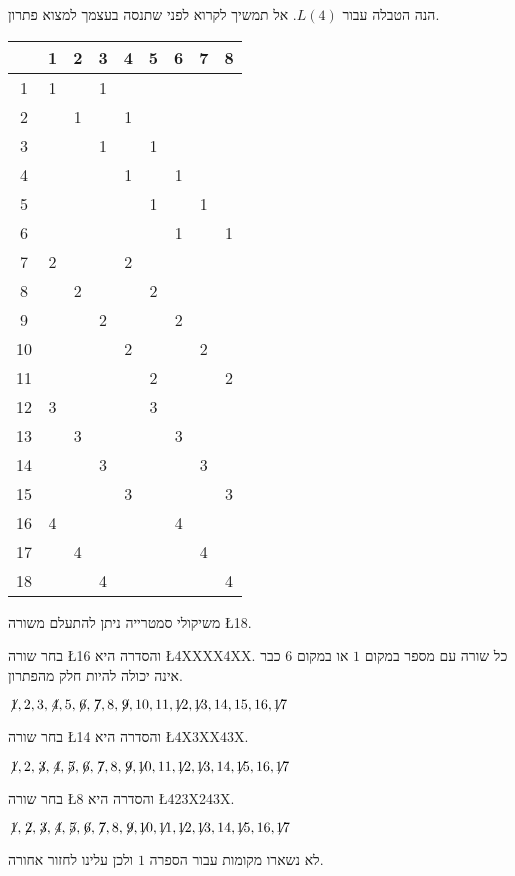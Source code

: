 הנה הטבלה עבור
$L(4)$.
אל תמשיך לקרוא לפני שתנסה בעצמך למצוא פתרון.
\begin{center}
\addtolength{\tabcolsep}{4pt}
\begin{tabular}{|c||c|c|c|c|c|c|c|c|}
\hline
&1&2&3&4&5&6&7&8\\\hline\hline
1&1&&1&&&&&\\\hline
2&&1&&1&&&&\\\hline
3&&&1&&1&&&\\\hline
4&&&&1&&1&&\\\hline
5&&&&&1&&1&\\\hline
6&&&&&&1&&1\\\hline
7&2&&&2&&&&\\\hline
8&&2&&&2&&&\\\hline
9&&&2&&&2&&\\\hline
10&&&&2&&&2&\\\hline
11&&&&&2&&&2\\\hline
12&3&&&&3&&&\\\hline
13&&3&&&&3&&\\\hline
14&&&3&&&&3&\\\hline
15&&&&3&&&&3\\\hline
16&4&&&&&4&&\\\hline
17&&4&&&&&4&\\\hline
18&&&4&&&&&4\\\hline
\end{tabular}
\end{center}
משיקולי סמטרייה ניתן להתעלם משורה
\L{18}.

\noindent 
בחר שורה
\L{16}
והסדרה היא
\L{4XXXX4XX}.
כל שורה עם מספר במקום
$1$
או במקום
$6$
כבר אינה יכולה להיות חלק מהפתרון.

$\not\! 1,2,3,\not\! 4,5,\not\! 6,\not\! 7,8,\not\! 9,10,11,\not\!\! 12,\not\!\! 13,14,15,16,\not\!\! 17$

\noindent
בחר שורה
\L{14}
והסדרה היא
\L{4X3XX43X}.

$\not\! 1,2,\not\! 3,\not\! 4,\not\! 5,\not\! 6,\not\! 7,8,\not\! 9,\not\!\! 10,11,\not\!\! 12,\not\!\! 13,14, \not\!\! 15,16,\not\!\! 17$

\noindent
בחר שורה
\L{8}
והסדרה היא
\L{423X243X}.

$\not\! 1,\not\! 2,\not\! 3,\not\! 4,\not\! 5,\not\! 6,\not\! 7,8,\not\! 9,\not\!\! 10,\not\!\! 11,\not\!\! 12,\not\!\! 13,14, \not\!\! 15,16,\not\!\! 17$

\noindent
לא נשארו מקומות עבור הספרה $1$ ולכן עלינו לחזור אחורה.

\smallskip

